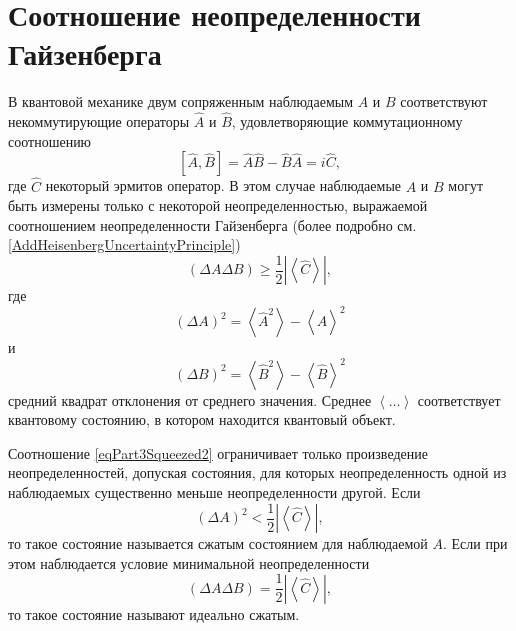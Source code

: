 \section{Соотношение неопределенности Гайзенберга}
В квантовой механике двум сопряженным наблюдаемым $A$ и $B$
соответствуют некоммутирующие операторы $\hat{A}$ и $\hat{B}$,
удовлетворяющие коммутационному соотношению
\begin{equation}
\left[
\hat{A}, \hat{B}
\right] = 
\hat{A}\hat{B} - \hat{B}\hat{A} = i \hat{C},
\nonumber
\end{equation}
где $\hat{C}$ некоторый эрмитов оператор. В этом случае наблюдаемые
$A$ и $B$ могут быть измерены только с некоторой неопределенностью,
выражаемой соотношением неопределенности Гайзенберга
(более подробно см. \autoref{AddHeisenbergUncertaintyPrinciple})
\begin{equation}
\left(
\Delta A \Delta B
\right) \ge \frac{1}{2} \left|\left<\hat{C}\right>\right|,
\label{eqPart3Squeezed2}
\end{equation}
где
\[
\left(\Delta A\right)^2 = \left<\hat{A}^2\right> - \left<\hat{A}\right>^2
\]
и
\[
\left(\Delta B\right)^2 = \left<\hat{B}^2\right> - \left<\hat{B}\right>^2
\]
средний квадрат отклонения от среднего значения. 
Среднее $\left<\dots\right>$ соответствует квантовому состоянию, в
котором находится квантовый объект.

Соотношение \eqref{eqPart3Squeezed2} ограничивает только произведение
неопределенностей, допуская состояния, для которых неопределенность
одной из наблюдаемых существенно меньше неопределенности другой.
Если 
\begin{equation}
\left(\Delta A\right)^2 < \frac{1}{2} \left|\left<\hat{C}\right>\right|,
\nonumber
\end{equation}
то такое состояние называется сжатым состоянием для наблюдаемой
$A$. Если при этом наблюдается условие минимальной неопределенности
\begin{equation}
\left(
\Delta A \Delta B
\right) = \frac{1}{2} \left|\left<\hat{C}\right>\right|,
\nonumber
\end{equation}
то такое состояние называют идеально сжатым.

